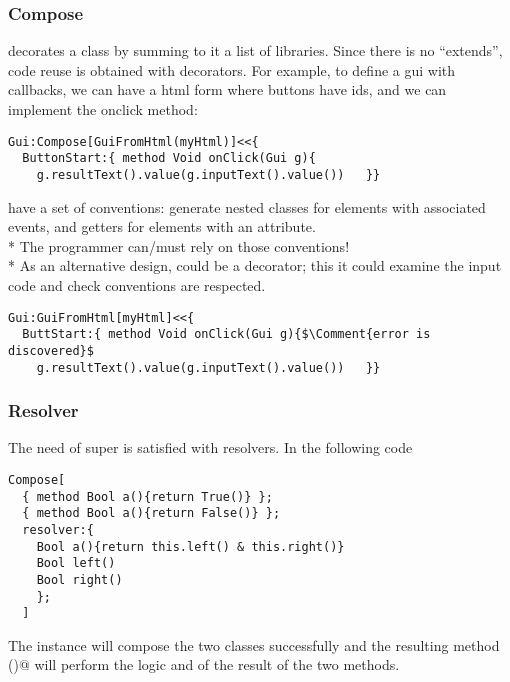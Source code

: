\begin{frame}[fragile]
\frametitle{Compose}
 \Q@Compose@ decorates a class by summing to it a list of libraries.
Since there is no ``extends'', code reuse is obtained with decorators.
For example, to define a gui with callbacks, we can have a html form where buttons have ids, and we can implement the onclick method:

\begin{NiceCode}{59ex}{0.8}
\begin{lstlisting}
Gui:Compose[GuiFromHtml(myHtml)]<<{
  ButtonStart:{ method Void onClick(Gui g){
    g.resultText().value(g.inputText().value())   }}
\end{lstlisting}
\end{NiceCode}

\Q@GuiFromHtml@ have a set of conventions: generate nested classes for elements with associated events, and getters for elements with an \Q@id@ attribute.\\*
The programmer can/must rely on those conventions!\\*
As an alternative design, \Q@GuiFromHtml@ could be a decorator; this it could examine the input code and check conventions are respected.
\begin{NiceCode}{59ex}{0.8}
\begin{lstlisting}
Gui:GuiFromHtml[myHtml]<<{
  ButtStart:{ method Void onClick(Gui g){$\Comment{error is discovered}$
    g.resultText().value(g.inputText().value())   }}
\end{lstlisting}
\end{NiceCode}
\end{frame}


\begin{frame}[fragile]
\frametitle{Resolver}
The need of super is satisfied with resolvers. In the following code
\begin{NiceCode}{59ex}{0.8}
\begin{lstlisting}
Compose[
  { method Bool a(){return True()} };
  { method Bool a(){return False()} };
  resolver:{
    Bool a(){return this.left() & this.right()}
    Bool left()
    Bool right()  
    };
  ]
\end{lstlisting}
\end{NiceCode}
The \Q@Compose@ instance will compose the two classes successfully and
the resulting method \Q@a()@ will perform the logic and of the result of the two methods.

\end{frame}


